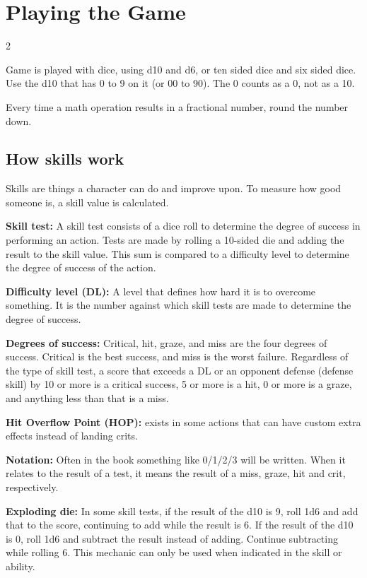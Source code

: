 \chapter{Playing the Game}

\begin{multicols}{2}

Game is played with dice, using d10 and d6, or ten sided dice and six sided dice. Use the d10 that has 0 to 9 on it (or 00 to 90). The 0 counts as a 0, not as a 10.

Every time a math operation results in a fractional number, round the number down.

\section{How skills work}

Skills are things a character can do and improve upon. To measure how good someone is, a skill value is calculated.

\textbf{Skill test:} A skill test consists of a dice roll to determine the degree of success in performing an action. Tests are made by rolling a 10-sided die and adding the result to the skill value. This sum is compared to a difficulty level to determine the degree of success of the action.

\textbf{Difficulty level (DL):} A level that defines how hard it is to overcome something. It is the number against which skill tests are made to determine the degree of success.

\textbf{Degrees of success:} Critical, hit, graze, and miss are the four degrees of success. Critical is the best success, and miss is the worst failure. Regardless of the type of skill test, a score that exceeds a DL or an opponent defense (defense skill) by 10 or more is a critical success, 5 or more is a hit, 0 or more is a graze, and anything less than that is a miss.

\textbf{Hit Overflow Point (HOP):} exists in some actions that can have custom extra effects instead of landing crits. 

\textbf{Notation:} Often in the book something like 0/1/2/3 will be written. When it relates to the result of a test, it means the result of a miss, graze, hit and crit, respectively. 

\textbf{Exploding die:} In some skill tests, if the result of the d10 is 9, roll 1d6 and add that to the score, continuing to add while the result is 6. If the result of the d10 is 0, roll 1d6 and subtract the result instead of adding. Continue subtracting while rolling 6. This mechanic can only be used when indicated in the skill or ability.


\end{multicols}
